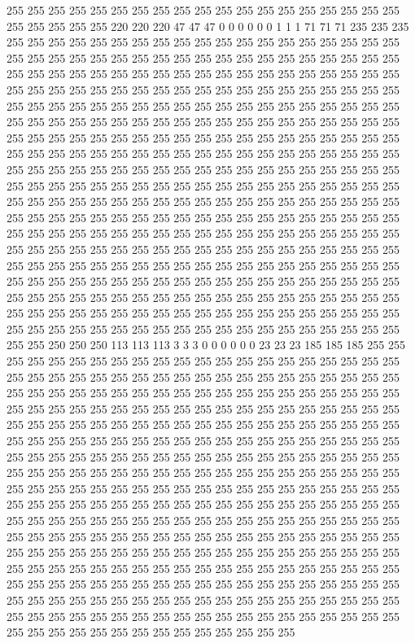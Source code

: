 255 255 255 255 255 255 255 255 255 255 255 255 255 255 255 255 255 255 255 255 255 255 255 255 220 220 220 47 47 47 0 0 0 0 0 0 1 1 1 71 71 71 235 235 235 255 255 255 255 255 255 255 255 255 255 255 255 255 255 255 255 255 255 255 255 255 255 255 255 255 255 255 255 255 255 255 255 255 255 255 255 255 255 255 255 255 255 255 255 255 255 255 255 255 255 255 255 255 255 255 255 255 255 255 255 255 255 255 255 255 255 255 255 255 255 255 255 255 255 255 255 255 255 255 255 255 255 255 
255 255 255 255 255 255 255 255 255 255 255 255 255 255 255 255 255 255 255 255 255 255 255 255 255 255 255 255 255 255 255 255 255 255 255 255 255 255 255 255 255 255 255 255 255 255 255 255 255 255 255 255 255 255 255 255 255 255 255 255 255 255 255 255 255 255 255 255 255 255 255 255 255 255 255 255 255 255 255 255 255 255 255 255 255 255 255 255 255 255 255 255 255 255 255 255 255 255 255 255 255 255 255 255 255 255 255 255 255 255 255 255 255 255 255 255 255 255 255 255 255 255 255 255 255 255 255 255 
255 255 255 255 255 255 255 255 255 255 255 255 255 255 255 255 255 255 255 255 255 255 255 255 255 255 255 255 255 255 255 255 255 255 255 255 255 255 255 255 255 255 255 255 255 255 255 255 255 255 255 255 255 255 255 255 255 255 255 255 255 255 255 255 255 255 255 255 255 255 255 255 255 255 255 255 255 255 255 255 255 255 255 255 255 255 255 255 255 255 255 255 255 255 255 255 255 255 255 255 255 255 255 255 255 255 255 255 255 255 255 255 255 255 255 255 255 255 255 255 255 255 255 255 255 255 255 255 
255 255 255 255 255 255 255 255 255 255 255 255 255 255 255 255 255 255 255 255 255 255 255 255 250 250 250 113 113 113 3 3 3 0 0 0 0 0 0 23 23 23 185 185 185 255 255 255 255 255 255 255 255 255 255 255 255 255 255 255 255 255 255 255 255 255 255 255 255 255 255 255 255 255 255 255 255 255 255 255 255 255 255 255 255 255 255 255 255 255 255 255 255 255 255 255 255 255 255 255 255 255 255 255 255 255 255 255 255 255 255 255 255 255 255 255 255 255 255 255 255 255 255 255 255 255 255 255 
255 255 255 255 255 255 255 255 255 255 255 255 255 255 255 255 255 255 255 255 255 255 255 255 255 255 255 255 255 255 255 255 255 255 255 255 255 255 255 255 255 255 255 255 255 255 255 255 255 255 255 255 255 255 255 255 255 255 255 255 255 255 255 255 255 255 255 255 255 255 255 255 255 255 255 255 255 255 255 255 255 255 255 255 255 255 255 255 255 255 255 255 255 255 255 255 255 255 255 255 255 255 255 255 255 255 255 255 255 255 255 255 255 255 255 255 255 255 255 255 255 255 255 255 255 255 255 255 
255 255 255 255 255 255 255 255 255 255 255 255 255 255 255 255 255 255 255 255 255 255 255 255 255 255 255 255 255 255 255 255 255 255 255 255 255 255 255 255 255 255 255 255 255 255 255 255 255 255 255 255 255 255 255 255 255 255 255 255 255 255 255 255 255 255 255 255 255 255 255 255 255 255 255 255 255 255 255 255 255 255 255 255 255 255 255 255 255 255 255 255 255 255 255 255 255 255 255 255 255 255 255 255 255 255 255 255 255 255 255 255 255 255 255 255 255 255 255 255 255 255 255 255 255 255 255 255 

